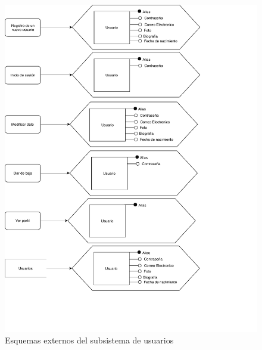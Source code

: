 \begin{figure}[H]
  \caption{Esquemas externos del subsistema de usuarios}
  \centering
  \includegraphics[scale=0.8]{diagramas/Esq-ext-usuario.pdf}
\end{figure}

